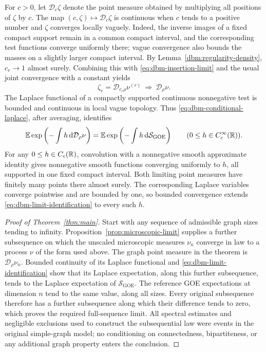 For \(c>0\), let \(\mathcal D_c\zeta\) denote the point measure
obtained by multiplying all positions of \(\zeta\) by \(c\).
The map \((c,\zeta)\mapsto\mathcal D_c\zeta\) is continuous when
\(c\) tends to a positive number and \(\zeta\) converges locally
vaguely. Indeed, the inverse images of a fixed compact support
remain in a common compact interval, and the corresponding test
functions converge uniformly there; vague convergence also bounds
the masses on a slightly larger compact interval.
By Lemma~\ref{dbm:regularity-density}, \(c_r\to1\) almost surely.
Combining this with \eqref{eq:dbm-insertion-limit} and the usual
joint convergence with a constant yields
\[
 \zeta_r=\mathcal D_{c_r\rho}\nu^{(r)}
       \ \Longrightarrow\ \mathcal D_\rho\nu.
\]
The Laplace functional of a compactly supported continuous
nonnegative test is bounded and continuous in local vague topology.
Thus \eqref{eq:dbm-conditional-laplace}, after averaging, identifies
\begin{equation}
 \label{eq:dbm-limit-identification}
 \mathbb E\exp\left(-\int h\,\mathrm d\mathcal D_\rho\nu\right)
   =\mathbb E\exp\left(-\int h\,\mathrm d\mathcal S_{\mathrm{GOE}}\right)
 \qquad (0\le h\in C_c^\infty(\mathbb R)).
\end{equation}
For any \(0\le h\in C_c(\mathbb R)\), convolution with a nonnegative
smooth approximate identity gives nonnegative smooth functions
converging uniformly to \(h\), all supported in one fixed compact
interval. Both limiting point measures have finitely many points
there almost surely. The corresponding Laplace variables converge
pointwise and are bounded by one, so bounded convergence extends
\eqref{eq:dbm-limit-identification} to every such \(h\).

\begin{proof}[Proof of Theorem~\ref{thm:main}]
Start with any sequence of admissible graph sizes tending to
infinity. Proposition~\ref{prop:microscopic-limit} supplies a further
subsequence on which the unscaled microscopic measures
\(\nu_n\) converge in law to a process \(\nu\) of the form used above.
The graph point measure in the theorem is
\(\mathcal D_\rho\nu_n\). Bounded continuity of its Laplace
functional and \eqref{eq:dbm-limit-identification} show that its
Laplace expectation, along this further subsequence, tends to the
Laplace expectation of \(\mathcal S_{\mathrm{GOE}}\).
The reference GOE expectations at dimension \(n\) tend to the same
value, along all sizes. Every original subsequence therefore has a
further subsequence along which their difference tends to zero,
which proves the required full-sequence limit. All spectral
estimates and negligible exclusions used to construct the
subsequential law were events in the original simple-graph model;
no conditioning on connectedness, bipartiteness, or any additional
graph property enters the conclusion.
\end{proof}
